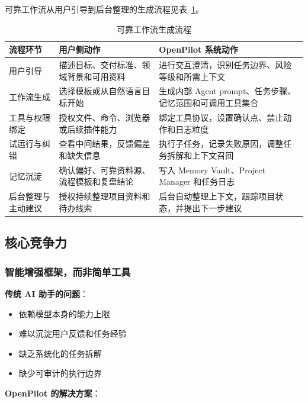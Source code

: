 \documentclass[12pt,a4paper]{ctexart}
\begin{document}
可靠工作流从用户引导到后台整理的生成流程见表~\ref{tab:reliable-agent-flow}。

\begin{table}[htbp]
  \centering
  \small
  \begin{tabularx}{\textwidth}{p{3cm} X X}
    \toprule
    \textbf{流程环节} & \textbf{用户侧动作} & \textbf{OpenPilot 系统动作} \\
    \midrule
    用户引导 & 描述目标、交付标准、领域背景和可用资料 & 进行交互澄清，识别任务边界、风险等级和所需上下文 \\
    工作流生成 & 选择模板或从自然语言目标开始 & 生成内部 Agent prompt、任务步骤、记忆范围和可调用工具集合 \\
    工具与权限绑定 & 授权文件、命令、浏览器或后续插件能力 & 绑定工具协议，设置确认点、禁止动作和日志粒度 \\
    试运行与纠错 & 查看中间结果，反馈偏差和缺失信息 & 执行子任务，记录失败原因，调整任务拆解和上下文召回 \\
    记忆沉淀 & 确认偏好、可靠资料源、流程模板和复盘结论 & 写入 Memory Vault、Project Manager 和任务日志 \\
    后台整理与主动建议 & 授权持续整理项目资料和待办线索 & 后台自动整理上下文，跟踪项目状态，并提出下一步建议 \\
    \bottomrule
  \end{tabularx}
  \caption{可靠工作流生成流程}
  \label{tab:reliable-agent-flow}
\end{table}

\subsection{核心竞争力}

\subsubsection{智能增强框架，而非简单工具}

\textbf{传统 AI 助手的问题}：
\begin{itemize}
  \item 依赖模型本身的能力上限
  \item 难以沉淀用户反馈和任务经验
  \item 缺乏系统化的任务拆解
  \item 缺少可审计的执行边界
\end{itemize}

\textbf{OpenPilot 的解决方案}：

\begin{center}
\end{center}
\end{document}

